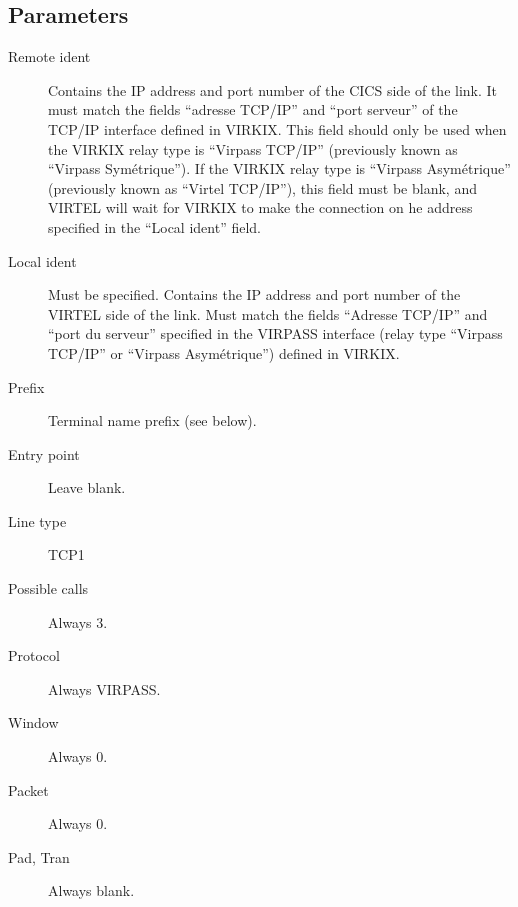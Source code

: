 \documentclass[letterpaper,10pt,english]{sphinxmanual}
\begin{document}
\subsection{Parameters}
\label{\detokenize{connectivity_guide:index-43}}\label{\detokenize{connectivity_guide:id16}}\begin{description}
\item[{Remote ident}] \leavevmode
Contains the IP address and port number of the CICS side of the link. It must match the fields “adresse TCP/IP” and “port serveur” of the TCP/IP interface defined in VIRKIX. This field should only be used when the VIRKIX relay type is “Virpass TCP/IP” (previously known as “Virpass Symétrique”). If the VIRKIX relay type is “Virpass Asymétrique” (previously known as “Virtel TCP/IP”), this field must be blank, and VIRTEL will wait for VIRKIX to make the connection on he address specified in the “Local ident” field.

\item[{Local ident}] \leavevmode
Must be specified. Contains the IP address and port number of the VIRTEL side of the link. Must match the fields “Adresse TCP/IP” and “port du serveur” specified in the VIRPASS interface (relay type “Virpass TCP/IP” or “Virpass Asymétrique”) defined in VIRKIX.

\item[{Prefix}] \leavevmode
Terminal name prefix (see below).

\item[{Entry point}] \leavevmode
Leave blank.

\item[{Line type}] \leavevmode
TCP1

\item[{Possible calls}] \leavevmode
Always 3.

\item[{Protocol}] \leavevmode
Always VIRPASS.

\item[{Window}] \leavevmode
Always 0.

\item[{Packet}] \leavevmode
Always 0.

\item[{Pad, Tran}] \leavevmode
Always blank.

\end{description}

\ignorespaces 
\end{document}
